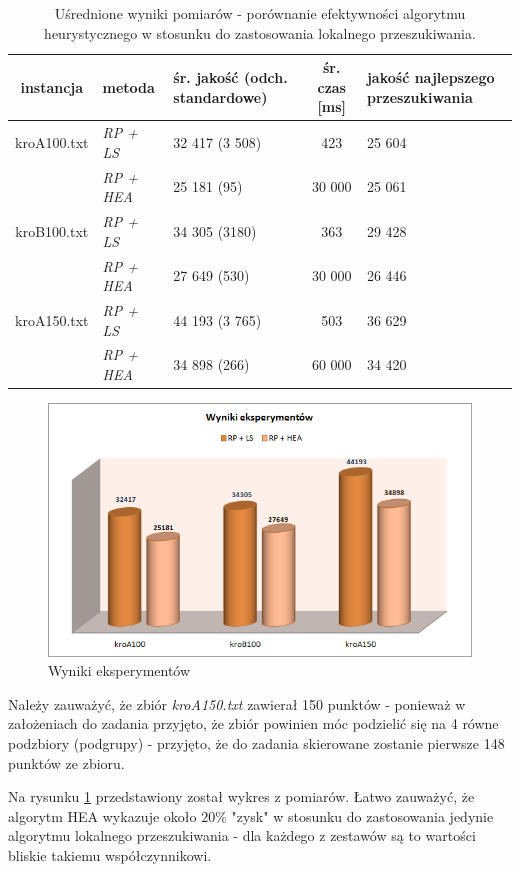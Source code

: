 \documentclass{article}
\begin{document}

\begin{table}[h!]
\begin{center}
\centering
  \begin{tabular}{| c | D | S | c | S | }
\hline
	instancja & metoda & śr. jakość (odch. standardowe) & śr. czas [ms] & jakość najlepszego przeszukiwania \\ \hline
    kroA100.txt & \emph{RP + LS} & 32 417 (3 508) & 423 & 25 604 \\
     & \emph{RP + HEA} & 25 181 (95) & 30 000 & 25 061 \\
\hline
    kroB100.txt & \emph{RP + LS} & 34 305 (3180) & 363 & 29 428 \\
     & \emph{RP + HEA} & 27 649 (530) & 30 000 & 26 446 \\
\hline
    kroA150.txt & \emph{RP + LS} & 44 193 (3 765) & 503 & 36 629 \\
     & \emph{RP + HEA} & 34 898 (266) & 60 000 & 34 420 \\
\hline
  \end{tabular}
\end{center}
\caption{Uśrednione wyniki pomiarów - porównanie efektywności algorytmu heurystycznego w stosunku do zastosowania lokalnego przeszukiwania.} \label{tab:wynikils}
\end{table}

\begin{figure}[h!]
\centering\includegraphics[width=17cm]{img/wyk1.png}
\caption{Wyniki eksperymentów}
\label{wyk:wyniki}
\end{figure}

Należy zauważyć, że zbiór \emph{kroA150.txt} zawierał 150 punktów - ponieważ w założeniach do zadania przyjęto, że zbiór powinien móc podzielić się na 4 równe podzbiory (podgrupy) - przyjęto, że do zadania skierowane zostanie pierwsze 148 punktów ze zbioru.

Na rysunku \ref{wyk:wyniki} przedstawiony został wykres z pomiarów. Łatwo zauważyć, że algorytm HEA wykazuje około $20\%$ "zysk" w stosunku do zastosowania jedynie algorytmu lokalnego przeszukiwania - dla każdego z zestawów są to wartości bliskie takiemu współczynnikowi.
\end{document}
